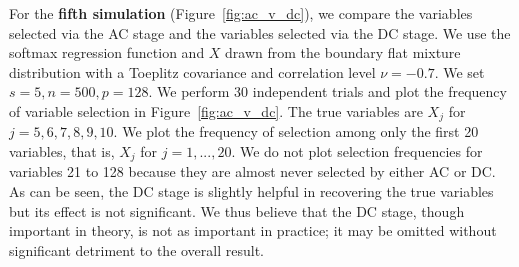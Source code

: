 
For the \textbf{fifth simulation} (Figure~\ref{fig:ac_v_dc}), we compare the variables selected via the AC stage and the variables selected via the DC stage. We use the softmax regression function and $X$ drawn from the boundary flat mixture distribution with a Toeplitz covariance and correlation level $\nu = -0.7$. We set $s=5, n=500, p=128$. We perform 30 independent trials and plot the frequency of variable selection in Figure~\ref{fig:ac_v_dc}. The true variables are $X_j$ for $j=5,6,7,8,9,10$. We plot the frequency of selection among only the first 20 variables, that is, $X_j$ for $j=1,...,20$. We do not plot selection frequencies for variables 21 to 128 because they are almost never selected by either AC or DC. As can be seen, the DC stage is slightly helpful in recovering the true variables but its effect is not significant. We thus believe that the DC stage, though important in theory, is not as important in practice; it may be omitted without significant detriment to the overall result. 

